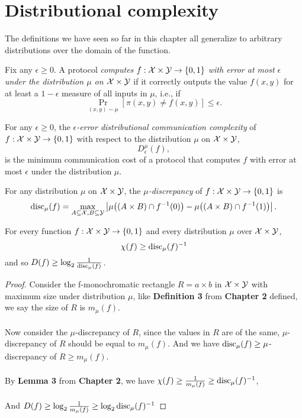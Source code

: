 \section{Distributional complexity}

The definitions we have seen so far in this chapter all generalize to arbitrary distributions over the domain of the function.

\begin{definition}
	Fix any $\epsilon \ge 0$. A protocol \emph{computes} $f : \mathcal{X} \times \mathcal{Y} \to \{0,1\}$ \emph{with error at most $\epsilon$ under the distribution $\mu$ on $\mathcal{X} \times \mathcal{Y}$} if it correctly outputs the value $f(x,y)$ for at least a $1-\epsilon$ measure of all inputs in $\mu$, i.e., if
	\[
	\Pr_{(x,y) \sim \mu}[ \pi(x,y) \neq f(x,y) ] \le \epsilon.
	\]
\end{definition}

\begin{definition}
	For any $\epsilon \ge 0$, the \emph{$\epsilon$-error distributional communication complexity} of $f : \mathcal{X} \times \mathcal{Y} \to \{0,1\}$ with respect to the distribution $\mu$ on $\mathcal{X} \times \mathcal{Y}$,
	\[
	D_\epsilon^{\mu}(f),
	\]
	is the minimum communication cost of a protocol that computes $f$ with error at most $\epsilon$ under the distribution $\mu$.
\end{definition}

\begin{definition}[$\mu$-Discrepancy]
	For any distribution $\mu$ on $\mathcal{X} \times \mathcal{Y}$, 
	the \emph{$\mu$-discrepancy} of $f : \mathcal{X} \times \mathcal{Y} \to \{0,1\}$ is
	\[
	\mathrm{disc}_\mu(f) = \max_{A \subseteq \mathcal{X}, B \subseteq \mathcal{Y}} 
	\left| \mu\big( (A \times B) \cap f^{-1}(0) \big) - \mu\big( (A \times B) \cap f^{-1}(1)\big) \right|.
	\]
\end{definition}

\begin{theorem}
	For every function $f : \mathcal{X} \times \mathcal{Y} \to \{0,1\}$ and every distribution $\mu$ over $\mathcal{X} \times \mathcal{Y}$, 
	\[
	\chi(f) \ge \mathrm{disc}_\mu(f)^{-1}
	\] 
	and so $D(f) \ge \log_2 \frac1{\mathrm{disc}_\mu(f)}$.
\end{theorem}

\begin{proof}
	Consider the f-monochromatic rectangle $R = a \times b$ in $\mathcal{X} \times \mathcal{Y}$ with maximum size under distribution $\mu$, like \textbf{Definition 3} from \textbf{Chapter 2} defined, we say the size of $R$ is $m_{\mu}(f)$.\\
	\\
	Now consider the $\mu$-discrepancy of $R$, since the values in $R$ are of the same, $\mu$-discrepancy of $R$ should be equal to $m_{\mu}(f)$. And we have $\mathrm{disc}_\mu(f) \ge \mu$-discrepancy of $R \ge m_{\mu}(f)$.\\
	\\
	By \textbf{Lemma 3} from \textbf{Chapter 2}, we have $\chi(f) \ge \frac{1}{m_\mu(f)} \ge \mathrm{disc}_\mu(f)^{-1}$,\\
	\\
	And $D(f) \ge \log_2 \frac{1}{m_\mu(f)} \ge \log_2 \mathrm{disc}_\mu(f)^{-1}$
	
\end{proof}

